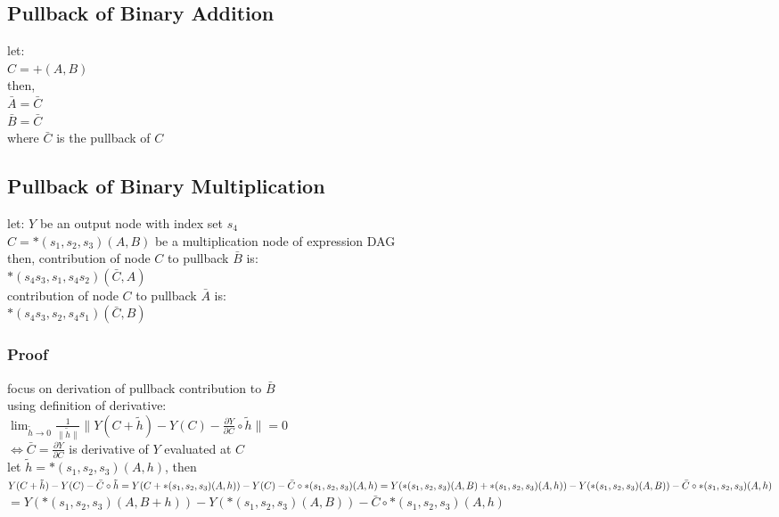 \documentclass[8pt]{extarticle}
\begin{document}
\begin{multicols*}{2}
  \subsection{Pullback of Binary Addition}
  let:\\
  $C = +(A,B)$\\
  then,\\
  $\bar{A} = \bar{C}$\\
  $\bar{B} = \bar{C}$\\
  where $\bar{C}$ is the pullback of $C$

  \vfill\null
  \columnbreak
  
  \subsection{Pullback of Binary Multiplication}
  let:
  $Y$ be an output node with index set $s_4$\\
  $C = *(s_1, s_2, s_3)(A, B)$ be a multiplication node of expression DAG\\
  then, contribution of node $C$ to pullback $\bar{B}$ is:\\
  $*(s_4 s_3, s_1, s_4 s_2)(\bar{C}, A)$\\
  contribution of node $C$ to pullback $\bar{A}$ is:\\
  $*(s_4 s_3, s_2, s_4 s_1)(\bar{C}, B)$

  \subsubsection{Proof}
  focus on derivation of pullback contribution to $\bar{B}$\\
  using definition of derivative:\\
  $\lim_{\tilde{h} \rightarrow 0} \frac{1}{\|\tilde{h}\|} \|Y(C+\tilde{h}) - Y(C) - \frac{\partial Y}{\partial C} \circ \tilde{h}\| = 0$\\
  $\iff \bar{C} = \frac{\partial Y}{\partial C}$ is derivative of $Y$ evaluated at $C$\\

  let $\tilde{h} = *(s_1, s_2, s_3)(A, h)$, then\\
  $Y(C+\tilde{h}) - Y(C) - \bar{C} \circ \tilde{h}\\
  = Y(C+*(s_1, s_2, s_3)(A,h)) - Y(C) - \bar{C} \circ *(s_1, s_2, s_3)(A,h)\\
  = Y(*(s_1,s_2,s_3)(A,B) + *(s_1, s_2, s_3)(A,h)) - Y(*(s_1,s_2,s_3)(A,B)) - \bar{C} \circ *(s_1, s_2, s_3)(A,h)$\\
  $= Y(*(s_1,s_2,s_3)(A,B+h)) - Y(*(s_1,s_2,s_3)(A,B)) - \bar{C} \circ *(s_1, s_2, s_3)(A,h)$\\


\end{multicols*}
\end{document}
